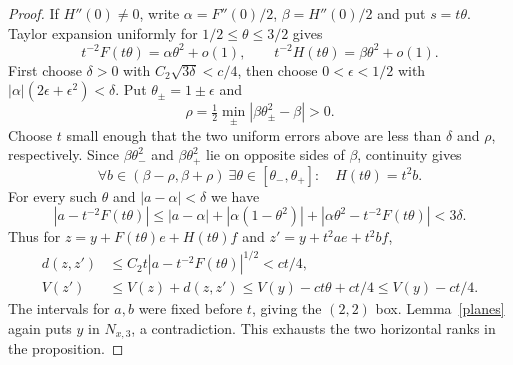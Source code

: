 \documentclass[11pt,letterpaper]{article}
\begin{document}
\begin{proof}
If $H''(0)\ne0$, write $\alpha=F''(0)/2$, $\beta=H''(0)/2$ and put
$s=t\theta$. Taylor expansion uniformly for $1/2\le\theta\le3/2$ gives
\[
 t^{-2}F(t\theta)=\alpha\theta^2+o(1),\qquad
 t^{-2}H(t\theta)=\beta\theta^2+o(1).
\]
First choose $\delta>0$ with $C_2\sqrt{3\delta}<c/4$, then choose
$0<\epsilon<1/2$ with $|\alpha| (2\epsilon+\epsilon^2)<\delta$.
Put $\theta_\pm=1\pm\epsilon$ and
\[
 \rho=\tfrac12\min_{\pm}|\beta\theta_\pm^2-\beta|>0 .
\]
Choose $t$ small enough that the two uniform errors above are less than
$\delta$ and $\rho$, respectively. Since $\beta\theta_-^2$ and
$\beta\theta_+^2$ lie on opposite sides of $\beta$, continuity gives
\[
 \forall b\in(\beta-\rho,\beta+\rho)\ \exists\theta\in[\theta_-,\theta_+]:
 \quad H(t\theta)=t^2b .
\]
For every such $\theta$ and $|a-\alpha|<\delta$ we have
\[
 |a-t^{-2}F(t\theta)|
 \le |a-\alpha|+|\alpha(1-\theta^2)|
      +|\alpha\theta^2-t^{-2}F(t\theta)|<3\delta .
\]
Thus for $z=y+F(t\theta)e+H(t\theta)f$ and $z'=y+t^2ae+t^2bf$,
\[
 \begin{aligned}
 d(z,z')&\le C_2t|a-t^{-2}F(t\theta)|^{1/2}<ct/4,\\
 V(z')&\le V(z)+d(z,z')\le V(y)-ct\theta+ct/4
          \le V(y)-ct/4 .
 \end{aligned}
\]
The intervals for $a,b$ were fixed before $t$, giving the $(2,2)$ box.
Lemma~\ref{planes} again puts $y$ in $N_{x,3}$, a contradiction.
This exhausts the two horizontal ranks in the proposition.
\end{proof}
\end{document}
